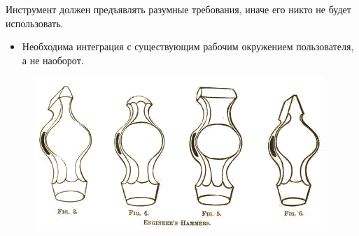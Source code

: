 \documentclass[presentation]{beamer}
\newcommand{\RaisedRightHand}{%
  \raisebox{-.50em}{\Large\HandRight}
}
\begin{document}
\begin{frame}{}
  \RaisedRightHand Инструмент должен
  предъявлять разумные требования, иначе его никто не будет
  использовать.

  \bigskip

  \begin{itemize}
  \item Необходима интеграция с существующим рабочим окружением
    пользователя, а не наоборот.
  \end{itemize}

  \begin{figure}[htb]
    \centering
    \includegraphics[height=.4\textheight]{hammer-01}
  \end{figure}
\end{frame}
\end{document}
